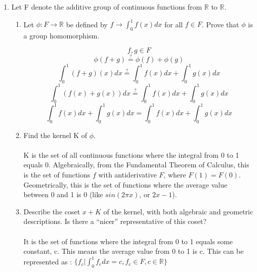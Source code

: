 
\usepackage{amsmath, amssymb, dsfont}

\newenvironment{amatrix}[1]{%
  \left(\begin{array}{@{}*{#1}{c}|c@{}}
}{%
  \end{array}\right)
}

\makeatletter
\renewcommand*\env@matrix[1][*\c@MaxMatrixCols c]{%
  \hskip -\arraycolsep
  \let\@ifnextchar\new@ifnextchar
  \array{#1}}
\makeatother

\newcommand{\?}{\stackrel{?}{=}}



\pagestyle{myheadings}


\begin{enumerate}
\item Let F denote the additive group of continuous functions from $\mathds{R}$ to $\mathds{R}$.
      \begin{enumerate}
      \item Let $\phi : F \rightarrow \mathds{R}$ be defined by $f \rightarrow \int_{0}^{1} f(x)dx$ for all $f \in F$. Prove that $\phi$ is a group homomorphism.

      $$f,g \in F$$
      $$\phi(f+g) \? \phi(f) + \phi(g)$$
      $$\int_{0}^{1}(f+g)(x)dx \? \int_{0}^{1}f(x)dx+\int_{0}^{1}g(x)dx$$
      $$\int_{0}^{1}(f(x)+g(x))dx \? \int_{0}^{1}f(x)dx+\int_{0}^{1}g(x)dx$$
      $$\int_{0}^{1}f(x)dx+\int_{0}^{1}g(x)dx = \int_{0}^{1}f(x)dx+\int_{0}^{1}g(x)dx$$

      \item Find the kernel K of $\phi$.\\\\

      K is the set of all continuous functions where the integral from 0 to 1 equals 0. Algebraically, from the Fundamental Theorem of Calculus, this is the set of functions $f$ with antiderivative $F$, where $F(1) = F(0)$. Geometrically, this is the set of functions where the average value between 0 and 1 is 0 (like $sin(2\pi x)$, or $2x-1$).\\

      \item Describe the coset $x+K$ of the kernel, with both algebraic and geometric descriptions. Is there a ``nicer'' representative of this coset?\\\\

      It is the set of functions where the integral from 0 to 1 equals some constant, c. This means the average value from 0 to 1 is c. This can be represented as : $\{f_c | \int_{0}^{1}f_c dx = c, f_c \in F, c \in \mathds{R}\}$\\
      

\end{enumerate}
\end{enumerate}
